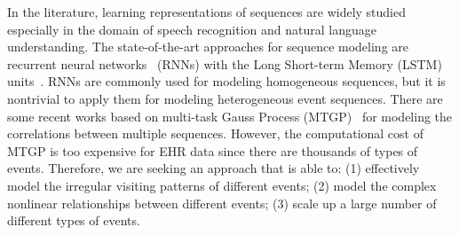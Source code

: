 \documentclass[letterpaper]{article} %
\begin{document}
In the literature, learning representations of sequences are widely studied especially in the domain of speech recognition and natural language understanding. The state-of-the-art approaches for sequence modeling are recurrent neural networks~\cite{mikolov2010recurrent} (RNNs) with the Long Short-term Memory (LSTM) units~\cite{hochreiter1997long}. RNNs are commonly used for modeling homogeneous sequences, but it is nontrivial to apply them for modeling heterogeneous event sequences. There are some recent works based on multi-task Gauss Process (MTGP)~\cite{ghassemi2015multivariate} for modeling the correlations between multiple sequences. However, the computational cost of MTGP is too expensive for EHR data since there are thousands of types of events. Therefore, we are seeking an approach that is able to: (1) effectively model the irregular visiting patterns of different events; (2) model the complex nonlinear relationships between different events; (3) scale up a large number of different types of events.





\end{document}
